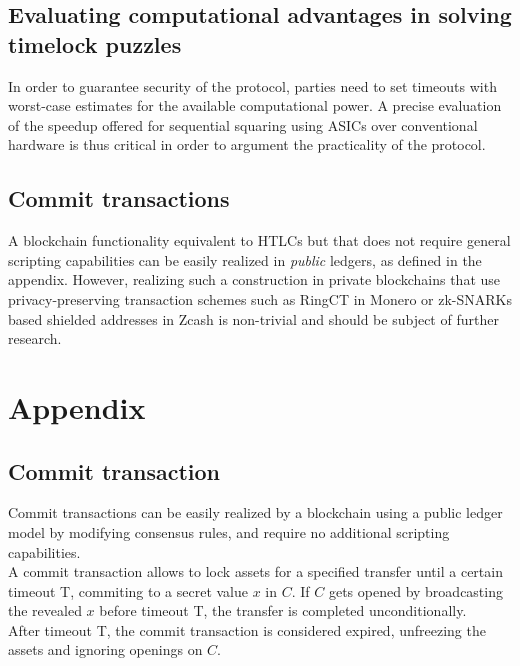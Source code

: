 \documentclass{article}      	%
\begin{document}
\subsection*{Evaluating computational advantages in solving timelock puzzles}
In order to guarantee security of the protocol, parties need to set timeouts with worst-case estimates for the available computational power. A precise evaluation of the speedup offered for sequential squaring using ASICs \cite{squaring_asic} over conventional hardware is thus critical in order to argument the practicality of the protocol.

\subsection*{Commit transactions}
A blockchain functionality equivalent to HTLCs but that does not require general scripting capabilities can be easily realized in \textit{public} ledgers, as defined in the appendix. However, realizing such a construction in private blockchains that use privacy-preserving transaction schemes such as RingCT \cite{ring_signatures} in Monero or zk-SNARKs based shielded addresses in Zcash \cite{zcash} is non-trivial and should be subject of further research.

\newpage
\printbibliography

\newpage

\appendix


\section*{Appendix}
\subsection*{Commit transaction}

Commit transactions can be easily realized by a blockchain using a public ledger model by modifying consensus rules, and require no additional scripting capabilities.  \\
A commit transaction allows to lock assets for a specified transfer until a certain timeout T, commiting to a secret value $x$ in $C$. If $C$ gets opened by broadcasting the revealed $x$ before timeout T, the transfer is completed unconditionally. \\ 
After timeout T, the commit transaction is considered expired, unfreezing the assets and ignoring openings on $C$.
\end{document}

